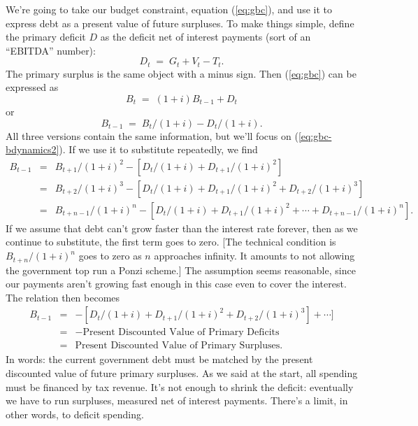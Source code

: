 \documentclass[letterpaper,12pt]{article}
\begin{document}
We're going to take our budget constraint, equation (\ref{eq:gbc}), 
and use it to express debt as a present value of future surpluses.  
To make things simple, define the primary deficit $D$ as the deficit 
net of interest payments (sort of an ``EBITDA'' number):
\[
    D_t \;=\;  G_t + V_t - T_t .
\]
The primary surplus is the same object with a minus sign. 
Then (\ref{eq:gbc}) can be expressed as 
\[
    B_{t}   \;=\; (1+i) B_{t-1} + D_t 
   \label{eq:gbc-bdynamics1}
\]
or 
\begin{equation}
    B_{t-1}   \;=\;  B_{t}/(1+i) - D_t/(1+i) .
    \label{eq:gbc-bdynamics2}
\end{equation}
All three versions contain the same information, but we'll 
focus on (\ref{eq:gbc-bdynamics2}).  
If we use it to substitute repeatedly, we find 
\begin{eqnarray*}
    B_{t-1}   &=&  B_{t+1}/(1+i)^2 - [D_t/(1+i)+ D_{t+1}/(1+i)^2] \\
            &=&  B_{t+2}/(1+i)^3 - 
                [D_t/(1+i)+ D_{t+1}/(1+i)^2 + D_{t+2}/(1+i)^3] \\
            &=&  B_{t+n-1}/(1+i)^n - 
                [D_t/(1+i)+ D_{t+1}/(1+i)^2 + \cdots + D_{t+n-1}/(1+i)^n] .
\end{eqnarray*}
If we assume that debt can't grow faster than the interest rate forever, 
then as we continue to substitute, the first term goes to zero.
[The technical condition is $B_{t+n}/(1+i)^n$ goes to zero as $n$ 
approaches infinity.
It amounts to not allowing the government top run a Ponzi scheme.]
The assumption seems reasonable, since our payments 
aren't growing fast enough in this case even to cover the interest.  
The relation then becomes  
\begin{eqnarray*}
    B_{t-1}   &=&  -[D_t/(1+i)+ D_{t+1}/(1+i)^2 + 
                   D_{t+2}/(1+i)^3] +   \cdots ]  \\
            &=& - \mbox{Present Discounted Value of Primary Deficits} \\
            &=& \mbox{Present Discounted Value of Primary Surpluses} .
\end{eqnarray*}
In words:   the current government debt must be matched 
by the present discounted value of future primary surpluses.  
As we said at the start, all spending must be financed by tax revenue.  
It's not enough to shrink the deficit:  eventually we have 
to run surpluses, measured net of interest payments.  
There's a limit, in other words, to deficit spending. 
\end{document}
